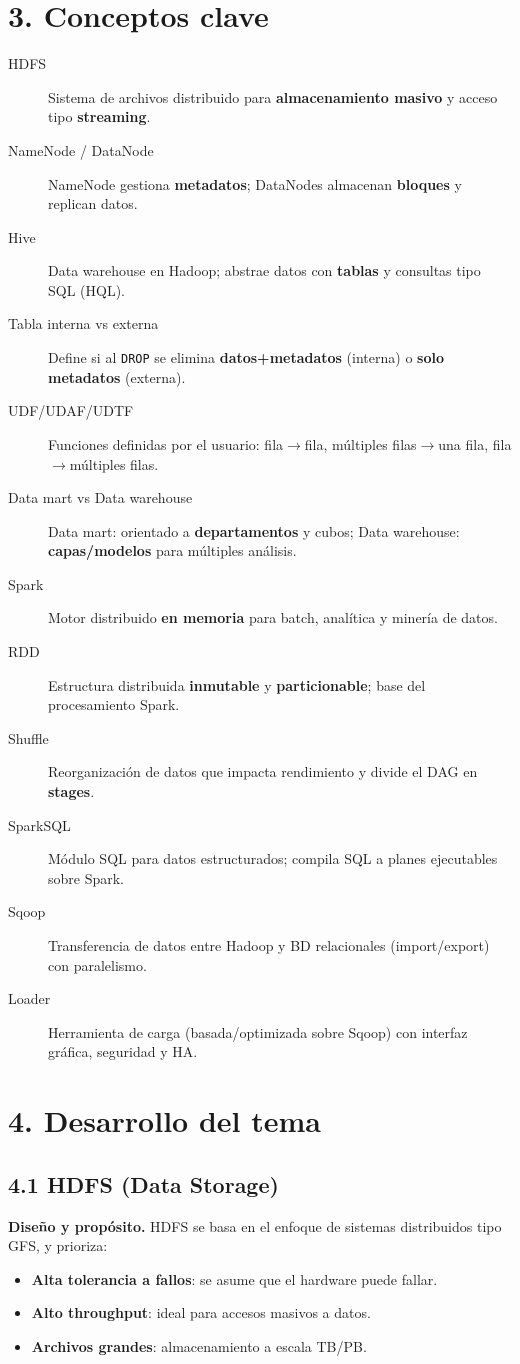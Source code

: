 \documentclass[8pt,a4paper,twocolumn]{article}
\begin{document}
\section{3. Conceptos clave}
\begin{description}
\item[HDFS] Sistema de archivos distribuido para \textbf{almacenamiento masivo} y acceso tipo \textbf{streaming}.
\item[NameNode / DataNode] NameNode gestiona \textbf{metadatos}; DataNodes almacenan \textbf{bloques} y replican datos.
\item[Hive] Data warehouse en Hadoop; abstrae datos con \textbf{tablas} y consultas tipo SQL (HQL).
\item[Tabla interna vs externa] Define si al \texttt{DROP} se elimina \textbf{datos+metadatos} (interna) o \textbf{solo metadatos} (externa).
\item[UDF/UDAF/UDTF] Funciones definidas por el usuario: fila$\rightarrow$fila, múltiples filas$\rightarrow$una fila, fila$\rightarrow$múltiples filas.
\item[Data mart vs Data warehouse] Data mart: orientado a \textbf{departamentos} y cubos; Data warehouse: \textbf{capas/modelos} para múltiples análisis.
\item[Spark] Motor distribuido \textbf{en memoria} para batch, analítica y minería de datos.
\item[RDD] Estructura distribuida \textbf{inmutable} y \textbf{particionable}; base del procesamiento Spark.
\item[Shuffle] Reorganización de datos que impacta rendimiento y divide el DAG en \textbf{stages}.
\item[SparkSQL] Módulo SQL para datos estructurados; compila SQL a planes ejecutables sobre Spark.
\item[Sqoop] Transferencia de datos entre Hadoop y BD relacionales (import/export) con paralelismo.
\item[Loader] Herramienta de carga (basada/optimizada sobre Sqoop) con interfaz gráfica, seguridad y HA.
\end{description}

\section{4. Desarrollo del tema}
\subsection{4.1 HDFS (Data Storage)}
\textbf{Diseño y propósito.} HDFS se basa en el enfoque de sistemas distribuidos tipo GFS, y prioriza:
\begin{itemize}
\item \textbf{Alta tolerancia a fallos}: se asume que el hardware puede fallar.
\item \textbf{Alto throughput}: ideal para accesos masivos a datos.
\item \textbf{Archivos grandes}: almacenamiento a escala TB/PB.
\end{itemize}
\end{document}

